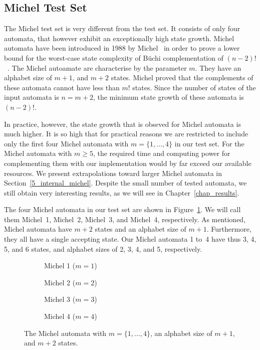\subsection{Michel Test Set}
\label{4_michel_testset}
The Michel test set is very different from the \goal{} test set. It consists of only four automata, that however exhibit an exceptionally high state growth. Michel automata have been introduced in 1988 by Michel~\cite{michel1988} in order to prove a lower bound for the worst-case state complexity of Büchi complementation of $(n-2)!$~\cite{1996_thomas}. The Michel autoamate are characterise by the parameter $m$. They have an alphabet size of $m+1$, and $m+2$ states. Michel proved that the complements of these automata cannot have less than $m!$ states. Since the number of states of the input automata is $n = m + 2$, the minimum state growth of these automata is $(n-2)!$.

In practice, however, the state growth that is obseved for Michel automata is much higher. It is so high that for practical reasons we are restricted to include only the first four Michel automata with $m=\{1,\dots,4\}$ in our test set. For the Michel automata with $m \geq 5$, the required time and computing power for complementing them with our implementation would by far exceed our available resources. We present extrapolations toward larger Michel automata in Section~\ref{5_internal_michel}. Despite the small number of tested automata, we still obtain very interesting results, as we will see in Chapter~\ref{chap_results}.

The four Michel automata in our test set are shown in Figure~\ref{michel_automata}. We will call them Michel~1, Michel~2, Michel~3, and Michel~4, respectively. As mentioned, Michel automata have $m+2$ states and an alphabet size of $m+1$. Furthermore, they all have a single accepting state. Our Michel automata 1 to~4 have thus 3, 4, 5, and 6 states, and alphabet sizes of 2, 3, 4, and 5, respectively.

\renewcommand{\subwidth}{0.42}
\begin{figure}[htb!]
\centering
  \begin{subfigure}[t]{\subwidth\textwidth}
  \MichelOne
  \caption{Michel 1 ($m=1$)}
  \end{subfigure}
  \begin{subfigure}[t]{\subwidth\textwidth}
  \MichelTwo
  \caption{Michel 2 ($m=2$)}
  \end{subfigure}

  \begin{subfigure}[b]{\subwidth\textwidth}
  \MichelThree
  \caption{Michel 3 ($m=3$)}
  \end{subfigure}
  \begin{subfigure}[b]{\subwidth\textwidth}
  \MichelFour
  \caption{Michel 4 ($m=4$)}
  \end{subfigure}
\caption{The Michel automata with $m = \{1,\dots,4\}$, an alphabet size of $m+1$, and $m+2$ states.}
\label{michel_automata}
\end{figure}

